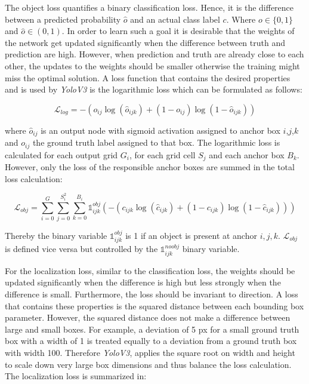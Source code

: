 The object loss quantifies a binary classification loss. Hence, it is the difference between a predicted probability $\hat o$ and an actual class label $c$. Where $o \in \{0,1\}$ and $\hat o \in (0,1)$. In order to learn such a goal it is desirable that the weights of the network get updated significantly when the difference between truth and prediction are high. However, when prediction and truth are already close to each other, the updates to the weights should be smaller otherwise the training might miss the optimal solution. A loss function that contains the desired properties and is used by \textit{YoloV3} is the logarithmic loss which can be formulated as follows:

\begin{equation}
\mathcal{L}_{log} = -(o_{ij}\log(\hat o_{ijk}) + (1 - o_{ij})\log(1 - \hat o_{ijk}))
\end{equation}

where $\hat o_{ij}$ is an output node with sigmoid activation assigned to anchor box $i$,$j$,$k$ and $ o_{ij}$ the ground truth label assigned to that box. The logarithmic loss is calculated for each output grid $G_i$, for each grid cell $S_j$ and each anchor box $B_k$. However, only the loss of the responsible anchor boxes are summed in the total loss calculation:

\begin{equation}
\mathcal{L}_{obj} = \sum_{i=0}^{G}\sum_{j=0}^{S_i^2}\sum_{k=0}^{B_i} \mathbb{1}_{ijk}^{obj}(-(c_{ijk}\log(\hat c_{ijk}) + (1 - c_{ijk})\log(1 - \hat c_{ijk})))
\end{equation}

Thereby the  binary variable $\mathbb{1}_{ijk}^{obj}$ is 1 if an object is present at anchor $i,j,k$. $\mathcal{L}_{obj}$ is defined vice versa but controlled by the $\mathbb{1}_{ijk}^{noobj}$ binary variable.

For the localization loss, similar to the classification loss, the weights should be updated significantly when the difference is high but less strongly when the difference is small. Furthermore, the loss should be invariant to direction. A loss that contains these properties is the squared distance between each bounding box parameter. However, the squared distance does not make a difference between large and small boxes. For example, a deviation of 5 px for a small ground truth box with a width of 1 is treated equally to a deviation from a ground truth box with width 100. Therefore \textit{YoloV3}, applies the square root on width and height to scale down very large box dimensions and thus balance the loss calculation. The localization loss is summarized in:

